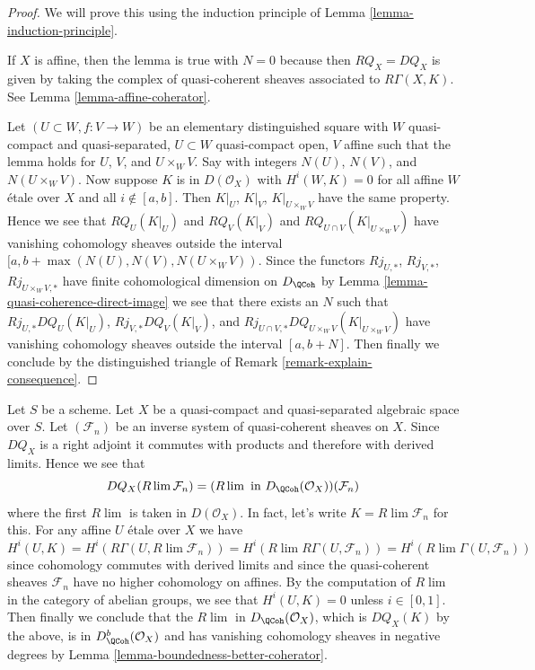 \begin{proof}
We will prove this using the induction principle of
Lemma \ref{lemma-induction-principle}.

\medskip\noindent
If $X$ is affine, then the lemma is true with $N = 0$ because then
$RQ_X = DQ_X$ is given by taking the complex of
quasi-coherent sheaves associated to $R\Gamma(X, K)$.
See Lemma \ref{lemma-affine-coherator}.

\medskip\noindent
Let $(U \subset W, f : V \to W)$ be an elementary distinguished square
with $W$ quasi-compact and quasi-separated, $U \subset W$
quasi-compact open, $V$ affine such that
the lemma holds for $U$, $V$, and $U \times_W V$.
Say with integers $N(U)$, $N(V)$, and $N(U \times_W V)$.
Now suppose $K$ is in $D(\mathcal{O}_X)$ with
$H^i(W, K) = 0$ for all affine $W$ \'etale over $X$ and all $i \not \in [a, b]$.
Then $K|_U$, $K|_V$, $K|_{U \times_W V}$ have the same property.
Hence we see that $RQ_U(K|_U)$ and $RQ_V(K|_V)$ and
$RQ_{U \cap V}(K|_{U \times_W V})$ have vanishing cohomology
sheaves outside the interval $[a, b + \max(N(U), N(V), N(U \times_W V))$.
Since the functors $Rj_{U, *}$, $Rj_{V, *}$, $Rj_{U \times_W V, *}$
have finite cohomological dimension on $D_\QCoh$ by
Lemma \ref{lemma-quasi-coherence-direct-image}
we see that there exists an $N$ such that
$Rj_{U, *}DQ_U(K|_U)$, $Rj_{V, *}DQ_V(K|_V)$, and
$Rj_{U \cap V, *}DQ_{U \times_W V}(K|_{U \times_W V})$ have vanishing
cohomology sheaves outside the interval $[a, b + N]$.
Then finally we conclude by the distinguished triangle
of Remark \ref{remark-explain-consequence}.
\end{proof}

\begin{example}
\label{example-inverse-limit-quasi-coherent}
Let $S$ be a scheme.
Let $X$ be a quasi-compact and quasi-separated algebraic space over $S$.
Let $(\mathcal{F}_n)$
be an inverse system of quasi-coherent sheaves on $X$.
Since $DQ_X$ is a right
adjoint it commutes with products and therefore with derived limits.
Hence we see that
$$
DQ_X(R\lim \mathcal{F}_n) =
(R\lim\text{ in }D_\QCoh(\mathcal{O}_X))(\mathcal{F}_n)
$$
where the first $R\lim$ is taken in $D(\mathcal{O}_X)$.
In fact, let's write $K = R\lim \mathcal{F}_n$ for this.
For any affine $U$ \'etale over $X$ we have
$$
H^i(U, K) =
H^i(R\Gamma(U, R\lim \mathcal{F}_n)) =
H^i(R\lim R\Gamma(U, \mathcal{F}_n)) =
H^i(R\lim \Gamma(U, \mathcal{F}_n))
$$
since cohomology commutes with derived limits and since
the quasi-coherent sheaves
$\mathcal{F}_n$ have no higher cohomology on affines.
By the computation of $R\lim$ in the category of
abelian groups, we see that $H^i(U, K) = 0$
unless $i \in [0, 1]$. Then finally we conclude that
the $R\lim$ in $D_\QCoh(\mathcal{O}_X)$, which is
$DQ_X(K)$ by the above, is in $D^b_\QCoh(\mathcal{O}_X)$
and has vanishing cohomology sheaves in negative degrees
by Lemma \ref{lemma-boundedness-better-coherator}.
\end{example}










